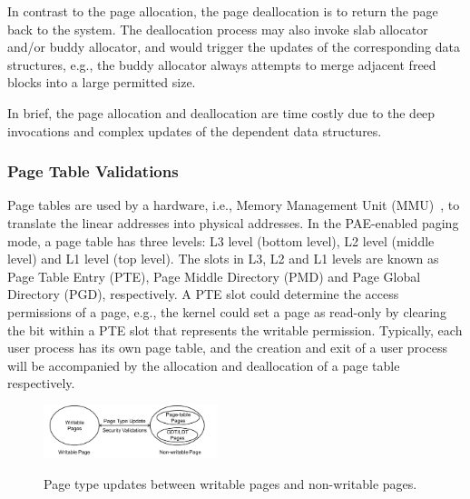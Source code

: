 In contrast to the page allocation, the page deallocation is to return the page back to the system.
The deallocation process may also invoke slab allocator and/or buddy allocator, and would trigger the updates of the corresponding data structures,
e.g., the buddy allocator always attempts to merge adjacent freed blocks into a large permitted size.

In brief, the page allocation and deallocation are time costly due to the deep invocations and complex updates of the dependent data structures.


\subsubsection{Page Table Validations}\label{sec:pv-security}
Page tables are used by a hardware, i.e., Memory Management Unit (MMU)~\cite{x86}, to translate the linear addresses into physical addresses.
In the PAE-enabled paging mode, a page table has three levels: L3 level (bottom level), L2 level (middle level) and L1 level (top level).
The slots in L3, L2 and L1 levels are known as Page Table Entry (PTE), Page Middle Directory (PMD) and Page Global Directory (PGD), respectively.
A PTE slot could determine the access permissions of a page, e.g., the kernel could set a page as read-only by clearing the bit within a PTE slot that represents the writable permission.
Typically, each user process has its own page table, and the creation and exit of a user process will be accompanied by the allocation and deallocation of a page table respectively.
\begin{figure}[ht]
\centering
\includegraphics[width=0.45\textwidth]{image/background/page-type-update.png} \\
\caption{Page type updates between writable pages and non-writable pages. }
\label{fig:page-type-updates}
\end{figure}



